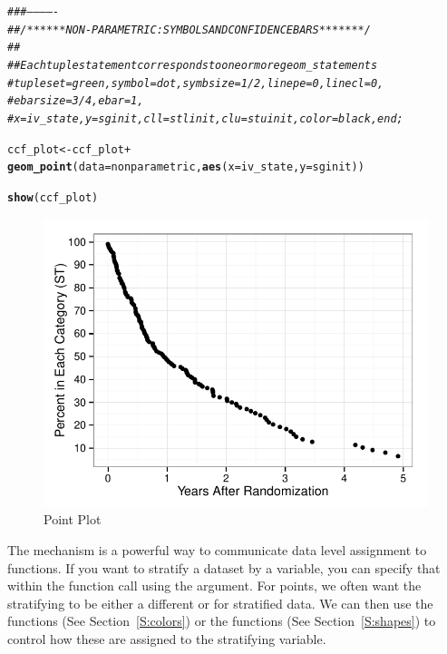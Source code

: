 \documentclass[nojss]{jss}\usepackage[]{graphicx}\usepackage[]{color}
\makeatletter
\def\maxwidth{ %
  \ifdim\Gin@nat@width>\linewidth
    \linewidth
  \else
    \Gin@nat@width
  \fi
}
\newcommand{\hlcom}[1]{\textcolor[rgb]{0.678,0.584,0.686}{\textit{#1}}}%
\newcommand{\hlopt}[1]{\textcolor[rgb]{0,0,0}{#1}}%
\newcommand{\hlstd}[1]{\textcolor[rgb]{0.345,0.345,0.345}{#1}}%
\newcommand{\hlkwb}[1]{\textcolor[rgb]{0.69,0.353,0.396}{#1}}%
\newcommand{\hlkwc}[1]{\textcolor[rgb]{0.333,0.667,0.333}{#1}}%
\newcommand{\hlkwd}[1]{\textcolor[rgb]{0.737,0.353,0.396}{\textbf{#1}}}%
\newenvironment{kframe}{%
 \def\at@end@of@kframe{}%
 \ifinner\ifhmode%
  \def\at@end@of@kframe{\end{minipage}}%
  \begin{minipage}{\columnwidth}%
 \fi\fi%
 \def\FrameCommand##1{\hskip\@totalleftmargin \hskip-\fboxsep
 \colorbox{shadecolor}{##1}\hskip-\fboxsep
     \hskip-\linewidth \hskip-\@totalleftmargin \hskip\columnwidth}%
 \MakeFramed {\advance\hsize-\width
   \@totalleftmargin\z@ \linewidth\hsize
   \@setminipage}}%
 {\par\unskip\endMakeFramed%
 \at@end@of@kframe}
\newenvironment{knitrout}{}{} %
\makeatother
\begin{document}
\begin{knitrout}\footnotesize
{}\color{fgcolor}\begin{kframe}
\begin{alltt}
\hlcom{###-------------}
\hlcom{## /******NON-PARAMETRIC: SYMBOLS AND CONFIDENCE BARS *******/}
\hlcom{##}
\hlcom{## Each tuple statement corresponds to one or more geom_ statements}
\hlcom{#     tuple set=green, symbol=dot, symbsize=1/2, linepe=0, linecl=0,}
\hlcom{#       ebarsize=3/4, ebar=1,}
\hlcom{#       x=iv_state, y=sginit, cll=stlinit, clu=stuinit, color=black, end;}

\hlstd{ccf_plot} \hlkwb{<-} \hlstd{ccf_plot} \hlopt{+}
  \hlkwd{geom_point}\hlstd{(}\hlkwc{data}\hlstd{=nonparametric,} \hlkwd{aes}\hlstd{(}\hlkwc{x}\hlstd{=iv_state,} \hlkwc{y}\hlstd{=sginit))}

\hlkwd{show}\hlstd{(ccf_plot)}
\end{alltt}
\end{kframe}\begin{figure}[htpb]

{\centering \includegraphics[width=\maxwidth]{figure/beamer-points-1} 

}

\caption[Point Plot]{Point Plot\label{F:points}}
\end{figure}


\end{knitrout}
The  mechanism is a powerful way to communicate data level assignment to  functions. If you want to stratify a dataset by a variable, you can specify that within the  function call using the  argument. For points, we often want the stratifying to be either a different  or  for stratified data. We can then use the  functions (See Section~\ref{S:colors}) or the  functions (See Section~\ref{S:shapes}) to control how these are assigned to the stratifying variable.
\end{document}
